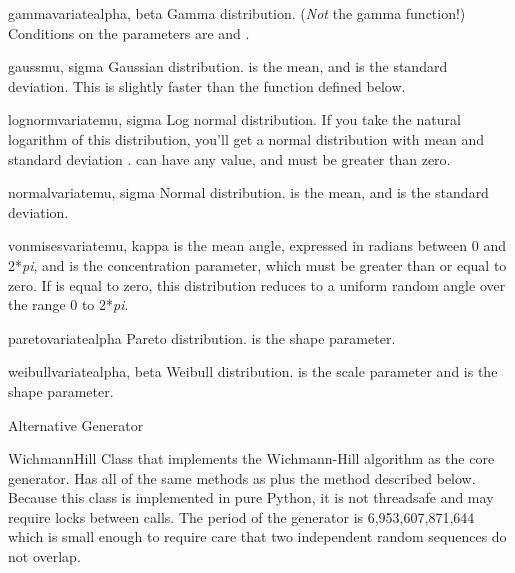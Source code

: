 \begin{funcdesc}{gammavariate}{alpha, beta}
  Gamma distribution.  (\emph{Not} the gamma function!)  Conditions on
  the parameters are  and .
\end{funcdesc}

\begin{funcdesc}{gauss}{mu, sigma}
  Gaussian distribution.   is the mean, and  is the
  standard deviation.  This is slightly faster than the
   function defined below.
\end{funcdesc}

\begin{funcdesc}{lognormvariate}{mu, sigma}
  Log normal distribution.  If you take the natural logarithm of this
  distribution, you'll get a normal distribution with mean 
  and standard deviation .   can have any value,
  and  must be greater than zero.
\end{funcdesc}

\begin{funcdesc}{normalvariate}{mu, sigma}
  Normal distribution.   is the mean, and  is the
  standard deviation.
\end{funcdesc}

\begin{funcdesc}{vonmisesvariate}{mu, kappa}
   is the mean angle, expressed in radians between 0 and
  2*\emph{pi}, and  is the concentration parameter, which
  must be greater than or equal to zero.  If  is equal to
  zero, this distribution reduces to a uniform random angle over the
  range 0 to 2*\emph{pi}.
\end{funcdesc}

\begin{funcdesc}{paretovariate}{alpha}
  Pareto distribution.   is the shape parameter.
\end{funcdesc}

\begin{funcdesc}{weibullvariate}{alpha, beta}
  Weibull distribution.   is the scale parameter and
   is the shape parameter.
\end{funcdesc}

Alternative Generator

\begin{classdesc}{WichmannHill}{}
Class that implements the Wichmann-Hill algorithm as the core generator.
Has all of the same methods as  plus the 
method described below.  Because this class is implemented in pure
Python, it is not threadsafe and may require locks between calls.  The
period of the generator is 6,953,607,871,644 which is small enough to
require care that two independent random sequences do not overlap.
\end{classdesc}

